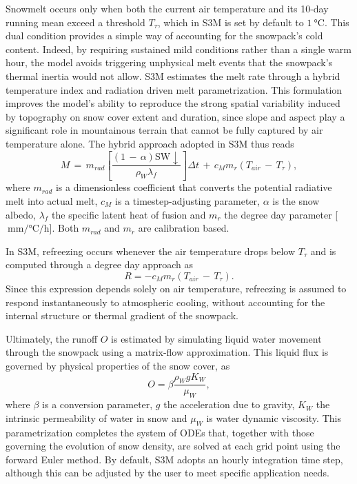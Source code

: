 Snowmelt occurs only when both the current air temperature and its 10-day running mean exceed a threshold $T_{\tau}$, which in S3M is set by default to 
$\SI{1}{\degreeCelsius}$. This dual condition provides a simple way of accounting for the snowpack's cold content. Indeed, by requiring sustained 
mild conditions rather than a single warm hour, the model avoids triggering unphysical melt events that the snowpack's thermal inertia would not allow. 
S3M estimates the melt rate through a hybrid temperature index and radiation driven melt parametrization. This formulation improves the model's ability 
to reproduce the strong spatial variability induced by topography on snow cover extent and duration, since slope and aspect play a significant role in 
mountainous terrain that cannot be fully captured by air temperature alone. The hybrid approach adopted in S3M thus reads 
\begin{equation}
    M\,=\,m_{rad}\left[\frac{\left(1\,-\,\alpha\right)\text{SW}\downarrow}{\rho_W \lambda_f}\right]\Delta t\,+\,c_M m_r \left(T_{air}\,-\,T_{\tau}\right),
    \label{eq:melt_S3M}
\end{equation}
where $m_{rad}$ is a dimensionless coefficient that converts the potential radiative melt into actual melt, $c_M$ is a timestep-adjusting parameter, $\alpha$ 
is the snow albedo, $\lambda_f$ the specific latent heat of fusion and $m_r$ the degree day parameter [$\SI{}{\milli\meter\per\degreeCelsius\per\hour}$]. 
Both $m_{rad}$ and $m_r$ are calibration based.

In S3M, refreezing occurs whenever the air temperature drops below $T_{\tau}$ and is computed through a degree day approach as 
\begin{equation}
    R = - c_M m_r \left(T_{air}\,-\,T_{\tau}\right).
    \label{eq:refreezing_S3M}
\end{equation}
Since this expression depends solely on air temperature, refreezing is assumed to respond instantaneously to atmospheric 
cooling, without accounting for the internal structure or thermal gradient of the snowpack.

Ultimately, the runoff $O$ is estimated by simulating liquid water movement through the snowpack using a matrix-flow approximation. 
This liquid flux is governed by physical properties of the snow cover, as 
\begin{equation}
    O = \beta \frac{\rho_W g K_W}{\mu_W}, 
    \label{eq:runoff_S3M}
\end{equation}
where $\beta$ is a conversion parameter, $g$ the acceleration due to gravity, $K_W$ the intrinsic permeability of water in snow and 
$\mu_W$ is water dynamic viscosity. This parametrization completes the system of ODEs that, together with those governing the 
evolution of snow density, are solved at each grid point using the forward Euler method. By default, S3M adopts an hourly 
integration time step, although this can be adjusted by the user to meet specific application needs.


